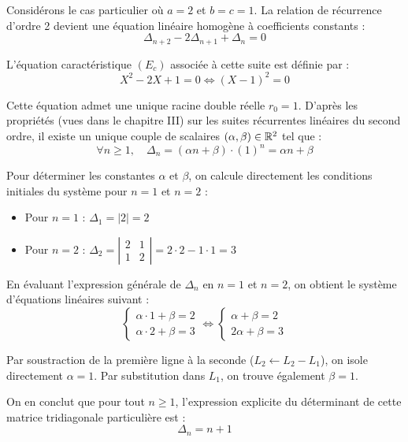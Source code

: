 \documentclass[12pt, a4paper]{report}
\begin{document}
Considérons le cas particulier où $a = 2$ et $b = c = 1$. La relation de récurrence d'ordre 2 devient une équation linéaire homogène à coefficients constants :
$$\Delta_{n+2} - 2\Delta_{n+1} + \Delta_n = 0$$

L'équation caractéristique $(E_c)$ associée à cette suite est définie par :
$$X^2 - 2X + 1 = 0 \iff (X - 1)^2 = 0$$

Cette équation admet une unique racine double réelle $r_0 = 1$. D'après les propriétés (vues dans le chapitre III) sur les suites récurrentes linéaires du second ordre, il existe un unique couple de scalaires $(\alpha, \beta) \in \mathbb{R}^2$ tel que :
$$\forall n \ge 1, \quad \Delta_n = (\alpha n + \beta) \cdot (1)^n = \alpha n + \beta$$

Pour déterminer les constantes $\alpha$ et $\beta$, on calcule directement les conditions initiales du système pour $n=1$ et $n=2$ :
\begin{itemize}
    \item Pour $n = 1$ : $\Delta_1 = |2| = 2$
    \item Pour $n = 2$ : $\Delta_2 = \left|\begin{matrix} 2 & 1 \\ 1 & 2 \end{matrix}\right| = 2 \cdot 2 - 1 \cdot 1 = 3$
\end{itemize}

En évaluant l'expression générale de $\Delta_n$ en $n=1$ et $n=2$, on obtient le système d'équations linéaires suivant :
$$\begin{cases}
    \alpha \cdot 1 + \beta = 2 \\
    \alpha \cdot 2 + \beta = 3
\end{cases} \iff \begin{cases}
    \alpha + \beta = 2 \\
    2\alpha + \beta = 3
\end{cases}$$

Par soustraction de la première ligne à la seconde ($L_2 \leftarrow L_2 - L_1$), on isole directement $\alpha = 1$. Par substitution dans $L_1$, on trouve également $\beta = 1$.

On en conclut que pour tout $n \ge 1$, l'expression explicite du déterminant de cette matrice tridiagonale particulière est :
$$\Delta_n = n + 1$$
\end{document}
